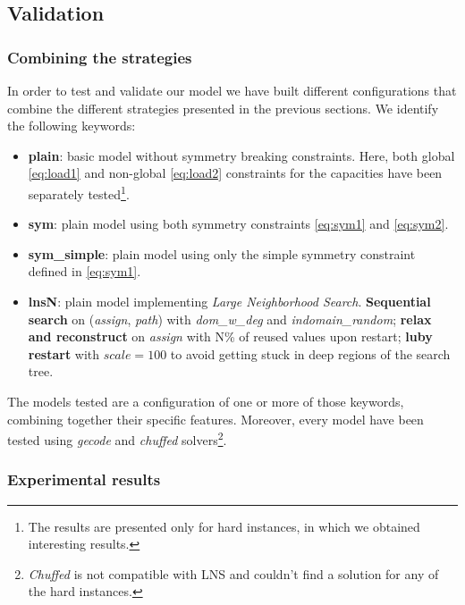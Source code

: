 \subsection{Validation}
\subsubsection{Combining the strategies}
In order to test and validate our model we have built different configurations that combine the different strategies presented in the previous sections. We identify the following keywords:
\begin{itemize}
    \item \textbf{plain}: basic model without symmetry breaking constraints. Here, both global \eqref{eq:load1} and non-global \eqref{eq:load2} constraints for the capacities have been separately tested\footnote{The results are presented only for hard instances, in which we obtained interesting results.}.
    \item \textbf{sym}: plain model using both symmetry constraints \eqref{eq:sym1} and \eqref{eq:sym2}.
    \item \textbf{sym\_simple}: plain model using only the simple symmetry constraint defined in \eqref{eq:sym1}.
    \item \textbf{lnsN}: plain model implementing \textit{Large Neighborhood Search}. 
    \textbf{Sequential search} on (\textit{assign}, \textit{path}) with \textit{dom\_w\_deg} and \textit{indomain\_random}; 
    \textbf{relax and reconstruct} on \textit{assign} with N\% of reused values upon restart;
    \textbf{luby restart} with $scale = 100$ to avoid getting stuck in deep regions of the search tree.    
\end{itemize}

The models tested are a configuration of one or more of those keywords, combining together their specific features. Moreover, every model have been tested using \textit{gecode} and \textit{chuffed} solvers\footnote{\textit{Chuffed} is not compatible with LNS and couldn't find a solution for any of the hard instances.}.
\subsubsection{Experimental results}
